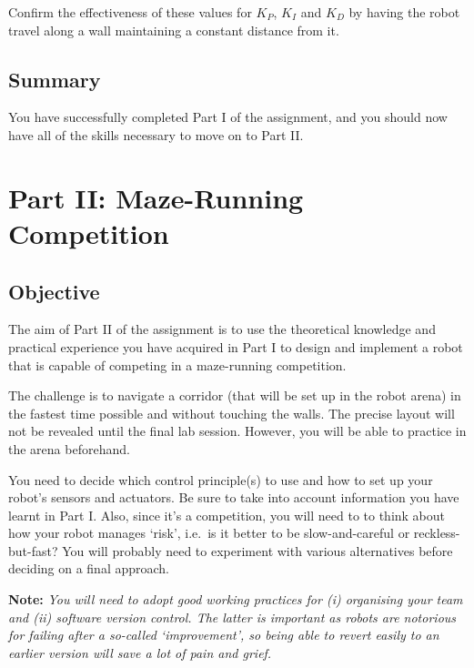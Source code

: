 \documentclass[hidelinks,a4paper,11pt]{article}
\begin{document}
\begin{todolist}
	\item Confirm the effectiveness of these values for $K_P$, $K_I$ and $K_D$ by having the robot travel along a wall maintaining a constant distance from it.
 \end{todolist}


\subsection{Summary}

You have successfully completed Part I of the assignment, and you should now have all of the skills necessary to move on to Part II.


\newpage
\section{Part II: Maze-Running Competition}

\subsection{Objective}

The aim of Part II of the assignment is to use the theoretical knowledge and practical experience you have acquired in Part I to design and implement a robot that is capable of competing in a maze-running competition.

The challenge is to navigate a corridor (that will be set up in the robot arena) in the fastest time possible and without touching the walls.  The precise layout will not be revealed until the final lab session.  However, you will be able to practice in the arena beforehand.

You need to decide which control principle(s) to use and how to set up your robot's sensors and actuators.  Be sure to take into account information you have learnt in Part I.  Also, since it's a competition, you will need to to think about how your robot manages `risk', i.e.\ is it better to be slow-and-careful or reckless-but-fast?  You will probably need to experiment with various alternatives before deciding on a final approach.

{\bfseries Note:}  \emph{You will need to adopt good working practices for (i) organising your team and (ii) software version control.  The latter is important as robots are notorious for failing after a so-called `improvement', so being able to revert easily to an earlier version will save a lot of pain and grief.}
\end{document}
